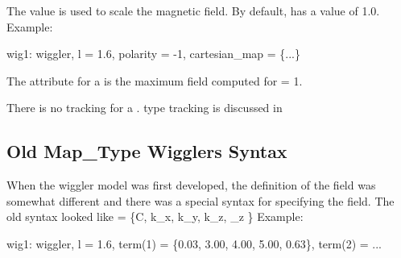 {The  value is used to scale the magnetic field. By
default,  has a value of 1.0.  Example:
\begin{example}
  wig1: wiggler, l = 1.6, polarity = -1, cartesian_map = \{...\}
\end{example}

The  attribute for a   is the
maximum field computed for  = 1.

There is no  tracking for a 
.  type tracking is discussed in 

\subsection{Old Map\_Type Wigglers Syntax}
\label{s:old.wiggler}

When the wiggler model was first developed, the definition of the field was somewhat
different and there was a special syntax for specifying the field. The old syntax looked
like
\Begineq
   = \{C, k_x, k_y, k_z, \phi_z \}
\Endeq
Example:
\begin{example}
  wig1: wiggler, l = 1.6, 
        term(1) = \{0.03, 3.00, 4.00, 5.00, 0.63\},
        term(2) = ...
\end{example}

}
